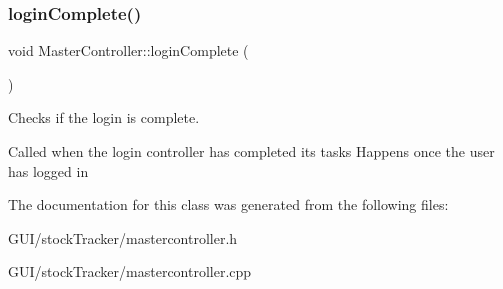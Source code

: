 \subsubsection{\texorpdfstring{login\+Complete()}{loginComplete()}}
{\footnotesize\ttfamily void Master\+Controller\+::login\+Complete (\begin{DoxyParamCaption}{ }\end{DoxyParamCaption})}



Checks if the login is complete. 

Called when the login controller has completed its tasks Happens once the user has logged in 

The documentation for this class was generated from the following files\+:\begin{DoxyCompactItemize}
\item 
G\+U\+I/stock\+Tracker/mastercontroller.\+h\item 
G\+U\+I/stock\+Tracker/mastercontroller.\+cpp\end{DoxyCompactItemize}
